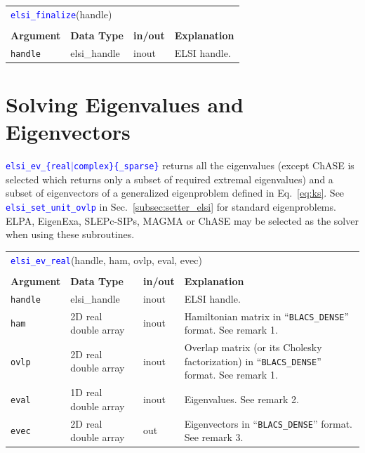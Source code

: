 \documentclass{report}
\newcommand{\api}[1]{\textcolor{blue}{\texttt{#1}}}
\begin{document}
\begin{tabular}[]{|p{20mm}|p{20mm}|p{10mm}|p{112mm}|}
\multicolumn{4}{l}{\api{elsi\_finalize}(handle)}\\
\multicolumn{4}{l}{}\\
\hline
\multicolumn{1}{|l|}{\textbf{Argument}} & \multicolumn{1}{l|}{\textbf{Data Type}} & \multicolumn{1}{l|}{\textbf{in/out}} & \multicolumn{1}{l|}{\textbf{Explanation}}\\
\hline
\texttt{handle} & elsi\_handle & inout & ELSI handle.\\
\hline
\end{tabular}

\section{Solving Eigenvalues and Eigenvectors}
\label{sec:ev}
\api{elsi\_ev\_\{real$\vert$complex\}\{\_sparse\}} returns all the eigenvalues (except ChASE is selected which returns
only a subset of required extremal eigenvalues) and a subset of eigenvectors of a generalized eigenproblem defined in Eq.~\ref{eq:ks}. See \api{elsi\_set\_unit\_ovlp} in Sec.~\ref{subsec:setter_elsi} for standard eigenproblems. ELPA, EigenExa, SLEPc-SIPs, MAGMA or ChASE may be selected as the solver when using these subroutines.

\begin{tabular}[]{|p{20mm}|p{40mm}|p{10mm}|p{92mm}|}
\multicolumn{4}{l}{\api{elsi\_ev\_real}(handle, ham, ovlp, eval, evec)}\\
\multicolumn{4}{l}{}\\
\hline
\multicolumn{1}{|l|}{\textbf{Argument}} & \multicolumn{1}{l|}{\textbf{Data Type}} & \multicolumn{1}{l|}{\textbf{in/out}} & \multicolumn{1}{l|}{\textbf{Explanation}}\\
\hline
\texttt{handle} & elsi\_handle         & inout & ELSI handle.\\
\hline
\texttt{ham}    & 2D real double array & inout & Hamiltonian matrix in ``\texttt{BLACS\_DENSE}'' format. See remark 1.\\
\hline
\texttt{ovlp}   & 2D real double array & inout & Overlap matrix (or its Cholesky factorization) in ``\texttt{BLACS\_DENSE}'' format. See remark 1.\\
\hline
\texttt{eval}   & 1D real double array & inout & Eigenvalues. See remark 2.\\
\hline
\texttt{evec}   & 2D real double array & out   & Eigenvectors in ``\texttt{BLACS\_DENSE}'' format. See remark 3.\\
\hline
\end{tabular}
\end{document}
